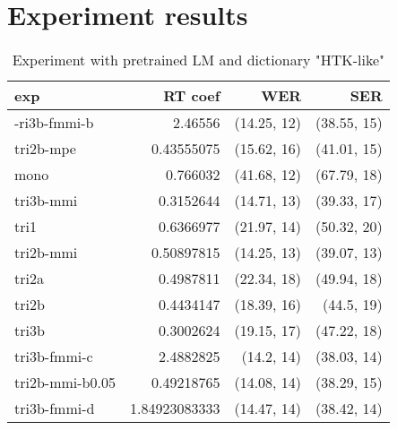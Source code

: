 \chapter{Experiment results}
\label{cha:results}

\begin{table}[!htp]\label{tab:htk_like_copy}\centering\begin{tabular}{l|rrr}
exp             & RT coef       & WER         & SER        \\ 
\hline
-ri3b-fmmi-b    & 2.46556       & (14.25, 12) & (38.55, 15)\\ 
tri2b-mpe       & 0.43555075    & (15.62, 16) & (41.01, 15)\\ 
mono            & 0.766032      & (41.68, 12) & (67.79, 18)\\ 
tri3b-mmi       & 0.3152644     & (14.71, 13) & (39.33, 17)\\ 
tri1            & 0.6366977     & (21.97, 14) & (50.32, 20)\\ 
tri2b-mmi       & 0.50897815    & (14.25, 13) & (39.07, 13)\\ 
tri2a           & 0.4987811     & (22.34, 18) & (49.94, 18)\\ 
tri2b           & 0.4434147     & (18.39, 16) & (44.5, 19) \\ 
tri3b           & 0.3002624     & (19.15, 17) & (47.22, 18)\\ 
tri3b-fmmi-c    & 2.4882825     & (14.2, 14)  & (38.03, 14)\\ 
tri2b-mmi-b0.05 & 0.49218765    & (14.08, 14) & (38.29, 15)\\ 
tri3b-fmmi-d    & 1.84923083333 & (14.47, 14) & (38.42, 14)
\end{tabular}
\caption{Experiment with pretrained LM and dictionary "\ac{HTK}-like"}
\end{table}  

